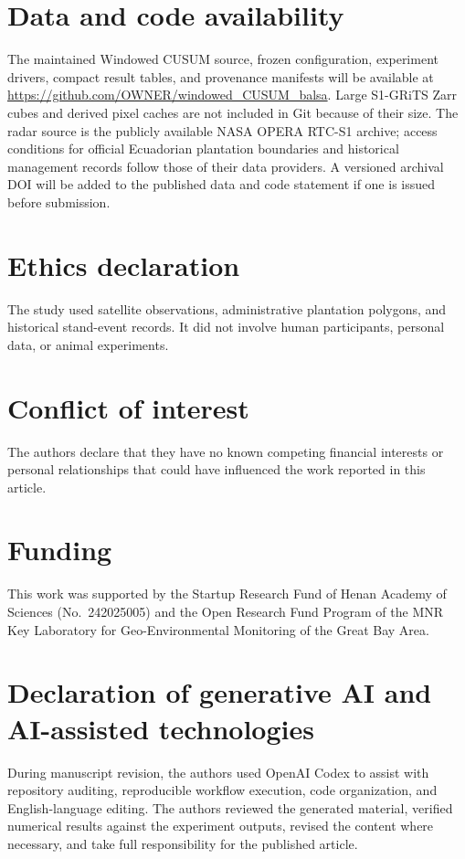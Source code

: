 \section*{Data and code availability}

The maintained Windowed CUSUM source, frozen configuration, experiment drivers, compact result tables, and provenance manifests will be available at \url{https://github.com/OWNER/windowed_CUSUM_balsa}. Large S1-GRiTS Zarr cubes and derived pixel caches are not included in Git because of their size. The radar source is the publicly available NASA OPERA RTC-S1 archive; access conditions for official Ecuadorian plantation boundaries and historical management records follow those of their data providers. A versioned archival DOI will be added to the published data and code statement if one is issued before submission.

\section*{Ethics declaration}

The study used satellite observations, administrative plantation polygons, and historical stand-event records. It did not involve human participants, personal data, or animal experiments.

\section*{Conflict of interest}

The authors declare that they have no known competing financial interests or personal relationships that could have influenced the work reported in this article.

\section*{Funding}

This work was supported by the Startup Research Fund of Henan Academy of Sciences (No.~242025005) and the Open Research Fund Program of the MNR Key Laboratory for Geo-Environmental Monitoring of the Great Bay Area.

\section*{Declaration of generative AI and AI-assisted technologies}

During manuscript revision, the authors used OpenAI Codex to assist with repository auditing, reproducible workflow execution, code organization, and English-language editing. The authors reviewed the generated material, verified numerical results against the experiment outputs, revised the content where necessary, and take full responsibility for the published article.
